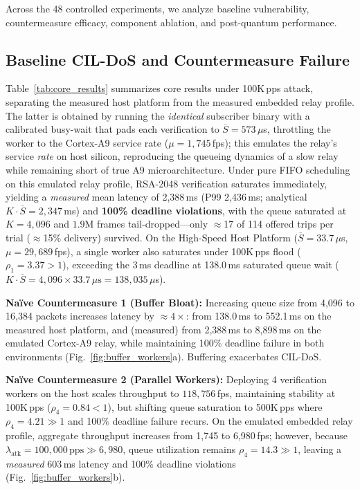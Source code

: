 \documentclass[journal]{IEEEtran}
\begin{document}
Across the 48 controlled experiments, we analyze baseline vulnerability, countermeasure efficacy, component ablation, and post-quantum performance.

\subsection{Baseline CIL-DoS and Countermeasure Failure}
Table~\ref{tab:core_results} summarizes core results under 100K\,pps attack, separating the measured host platform from the measured embedded relay profile. The latter is obtained by running the \emph{identical} subscriber binary with a calibrated busy-wait that pads each verification to $\overline{S}=573\,\mu$s, throttling the worker to the Cortex-A9 service rate ($\mu=1{,}745$\,fps); this emulates the relay's service \emph{rate} on host silicon, reproducing the queueing dynamics of a slow relay while remaining short of true A9 microarchitecture.
Under pure FIFO scheduling on this emulated relay profile, RSA-2048 verification saturates immediately, yielding a \emph{measured} mean latency of 2,388\,ms (P99 2,436\,ms; analytical $K\cdot\overline{S}=2{,}347$\,ms) and \textbf{100\% deadline violations}, with the queue saturated at $K=4{,}096$ and $1.9$M frames tail-dropped---only $\approx$17 of 114 offered trips per trial ($\approx$15\% delivery) survived. On the High-Speed Host Platform ($\overline{S} = 33.7\,\mu$s, $\mu = 29{,}689$\,fps), a single worker also saturates under 100K\,pps flood ($\rho_1 = 3.37 > 1$), exceeding the 3\,ms deadline at 138.0\,ms saturated queue wait ($K \cdot \overline{S} = 4{,}096 \times 33.7\,\mu\text{s} = 138{,}035\,\mu$s).

\textbf{Na\"ive Countermeasure 1 (Buffer Bloat):} Increasing queue size from 4,096 to 16,384 packets increases latency by $\approx 4\times$: from 138.0\,ms to 552.1\,ms on the measured host platform, and (measured) from 2,388\,ms to 8,898\,ms on the emulated Cortex-A9 relay, while maintaining 100\% deadline failure in both environments (Fig.~\ref{fig:buffer_workers}a). Buffering exacerbates CIL-DoS.

\textbf{Na\"ive Countermeasure 2 (Parallel Workers):} Deploying 4 verification workers on the host scales throughput to $118{,}756$\,fps, maintaining stability at 100K\,pps ($\rho_4 = 0.84 < 1$), but shifting queue saturation to 500K\,pps where $\rho_4 = 4.21 \gg 1$ and 100\% deadline failure recurs. On the emulated embedded relay profile, aggregate throughput increases from 1,745 to 6,980\,fps; however, because $\lambda_{\text{atk}} = 100{,}000\,\text{pps} \gg 6{,}980$, queue utilization remains $\rho_4 = 14.3 \gg 1$, leaving a \emph{measured} 603\,ms latency and 100\% deadline violations (Fig.~\ref{fig:buffer_workers}b).
\end{document}
